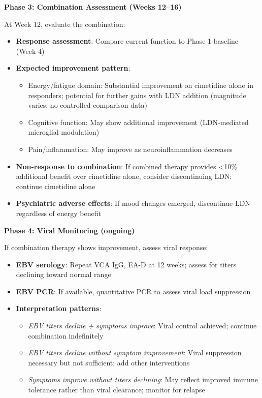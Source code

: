 \begin{protocol}
\textbf{Phase 3: Combination Assessment (Weeks 12--16)}

At Week 12, evaluate the combination:

\begin{itemize}
    \item \textbf{Response assessment}: Compare current function to Phase 1 baseline (Week 4)
    \item \textbf{Expected improvement pattern}:
    \begin{itemize}
        \item Energy/fatigue domain: Substantial improvement on cimetidine alone in responders; potential for further gains with LDN addition (magnitude varies; no controlled comparison data)
        \item Cognitive function: May show additional improvement (LDN-mediated microglial modulation)
        \item Pain/inflammation: May improve as neuroinflammation decreases
    \end{itemize}
    \item \textbf{Non-response to combination}: If combined therapy provides <10\% additional benefit over cimetidine alone, consider discontinuing LDN; continue cimetidine alone
    \item \textbf{Psychiatric adverse effects}: If mood changes emerged, discontinue LDN regardless of energy benefit
\end{itemize}

\textbf{Phase 4: Viral Monitoring (ongoing)}

If combination therapy shows improvement, assess viral response:

\begin{itemize}
    \item \textbf{EBV serology}: Repeat VCA IgG, EA-D at 12 weeks; assess for titers declining toward normal range
    \item \textbf{EBV PCR}: If available, quantitative PCR to assess viral load suppression
    \item \textbf{Interpretation patterns}:
    \begin{itemize}
        \item \textit{EBV titers decline + symptoms improve}: Viral control achieved; continue combination indefinitely
        \item \textit{EBV titers decline without symptom improvement}: Viral suppression necessary but not sufficient; add other interventions
        \item \textit{Symptoms improve without titers declining}: May reflect improved immune tolerance rather than viral clearance; monitor for relapse
    \end{itemize}
\end{itemize}


\end{protocol}
